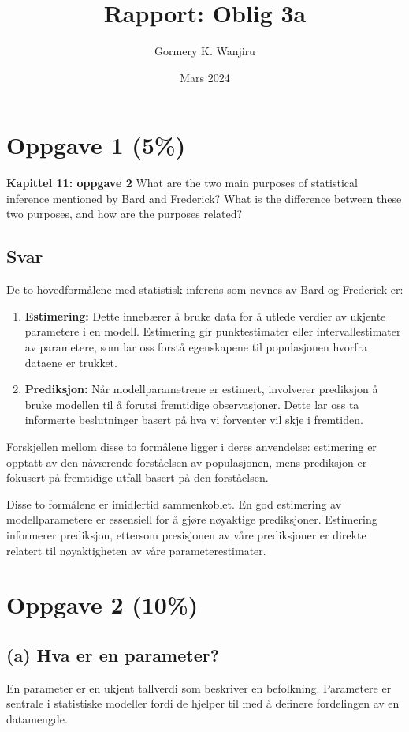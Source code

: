 \documentclass{article}
\title{Rapport: Oblig 3a}
\author{Gormery K. Wanjiru}
\date{Mars 2024}
\begin{document}
\maketitle

\section{Oppgave 1 (5\%)}
\textbf{Kapittel 11: oppgave 2}
What are the two main purposes of statistical inference mentioned by Bard and Frederick? What is the difference between these two purposes, and how are the purposes related?

\subsection*{Svar}
De to hovedformålene med statistisk inferens som nevnes av Bard og Frederick er:

\begin{enumerate}
  \item \textbf{Estimering:} Dette innebærer å bruke data for å utlede verdier av ukjente parametere i en modell. Estimering gir punktestimater eller intervallestimater av parametere, som lar oss forstå egenskapene til populasjonen hvorfra dataene er trukket.
  \item \textbf{Prediksjon:} Når modellparametrene er estimert, involverer prediksjon å bruke modellen til å forutsi fremtidige observasjoner. Dette lar oss ta informerte beslutninger basert på hva vi forventer vil skje i fremtiden.
\end{enumerate}

Forskjellen mellom disse to formålene ligger i deres anvendelse: estimering er opptatt av den nåværende forståelsen av populasjonen, mens prediksjon er fokusert på fremtidige utfall basert på den forståelsen.

Disse to formålene er imidlertid sammenkoblet. En god estimering av modellparametere er essensiell for å gjøre nøyaktige prediksjoner. Estimering informerer prediksjon, ettersom presisjonen av våre prediksjoner er direkte relatert til nøyaktigheten av våre parameterestimater.


\section{Oppgave 2 (10\%)}
\subsection*{(a) Hva er en parameter?}
En parameter er en ukjent tallverdi som beskriver en befolkning. Parametere er sentrale i statistiske modeller fordi de hjelper til med å definere fordelingen av en datamengde.
\end{document}
